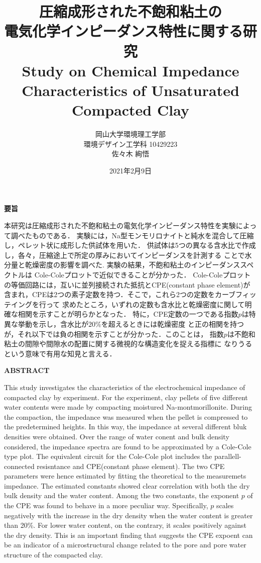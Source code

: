 ﻿\documentclass[11pt,a4j]{mybook2}
\title{
\vspace{20mm}
圧縮成形された不飽和粘土の\\
電気化学インピーダンス特性に関する研究
\\
\vspace{5mm}
Study on Chemical Impedance Characteristics 
of Unsaturated Compacted Clay
\vspace{60mm}
}
\date{2021年2月9日}
\author{
	\vspace{40mm}
岡山大学環境理工学部\\
環境デザイン工学科 10429223\\
	佐々木 絢悟
}
\begin{document}
\maketitle
\begin{center}
\begin{minipage}{15cm}
\begin{center}
	{\bf 要旨}
\end{center}
本研究は圧縮成形された不飽和粘土の電気化学インピーダンス特性を実験によって調べたものである．
実験には，Na型モンモリロナイトと純水を混合して圧縮し，ペレット状に成形した供試体を用いた．
供試体は5つの異なる含水比で作成し，各々，圧縮途上で所定の厚みにおいてインピーダンスを計測する
ことで水分量と乾燥密度の影響を調べた. 実験の結果，不飽和粘土のインピーダンススペクトルは
Cole-Coleプロットで近似できることが分かった．
Cole-Coleプロットの等価回路には，互いに並列接続された抵抗とCPE(constant phase element)が
含まれ，CPEは2つの素子定数を持つ．そこで，これら2つの定数をカーブフィッテイングを行って
求めたところ，いずれの定数も含水比と乾燥密度に関して明確な相関を示すことが明らかとなった．
特に，CPE定数の一つである指数$p$は特異な挙動を示し，含水比が$20\%$を超えるときには乾燥密度
と正の相関を持つが，それ以下では負の相関を示すことが分かった．このことは，
指数$p$は不飽和粘土の間隙や間隙水の配置に関する微視的な構造変化を捉える指標に
なりうるという意味で有用な知見と言える．
	\vspace{15mm}
\begin{center}
	{\bf ABSTRACT}
\end{center}
This study investigates the characteristics of the electrochemical impedance of compacted clay by experiment.
For the experiment, clay pellets of five different water contents were made by compacting moistured Na-montmorillonite.
During the compaction, the impedance was measured when the pellet is compressed to the predetermined heights. 
In this way, the impedance at several different bluk densities were obtained.
Over the range of water conent and bulk density considered,  the impedance spectra are found to be 
approximated by a Cole-Cole type plot. The equivalent circuit for the Cole-Cole plot includes the parallell-connected 
resisntance and CPE(constant phase element). The two CPE parameters were hence estimated by fitting the theoretical 
to the measuremets impedance. The estimated constants showed clear correlation with both the dry bulk density 
and the water content. Among the two constants, the exponent $p$ of the CPE was found to behave in a more peculiar way. 
Specifically, $p$ scales negatively with the increase in the dry density when the water content is greater than 20\%. 
For lower water content, on the contrary, it scales positively against the dry density. 
This is an important finding that suggests the CPE expoent can be an indicator of a microstructural change 
related to the pore and pore water structure of the compacted clay.
\end{minipage}
\end{center}
\end{document}
